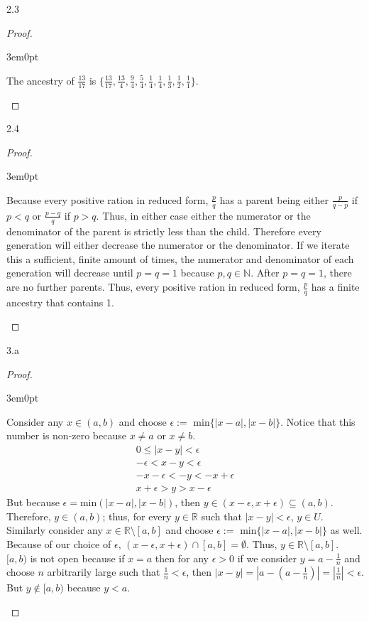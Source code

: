 \documentclass[11pt]{article}
\newcommand{\R}{\mathbb{R}}
\newcommand{\N}{\mathbb{N}}
\newenvironment{myproof}
{\begin{proof} \begin{adjustwidth}{3em}{0pt}$ $\par\nobreak\ignorespaces}
{\end{adjustwidth} \end{proof}}
\begin{document}
\begin{flushleft}
2.3
\begin{myproof}
The ancestry of $\frac{13}{17}$ is $\{ \frac{13}{17} , \frac{13}{4}, \frac{9}{4}, \frac{5}{4}, \frac{1}{4}, \frac{1}{4}, \frac{1}{3}, \frac{1}{2}, \frac{1}{1} \}$.
\end{myproof}

2.4

\begin{myproof}
Because every positive ration in reduced form, $\frac{p}{q}$ has a parent being either $\frac{p}{q-p}$ if $p<q$ or $\frac{p-q}{q}$ if $p>q$. Thus, in either case either the numerator or the denominator of the parent is strictly less than the child. Therefore every generation will either decrease the numerator or the denominator. If we iterate this a sufficient, finite amount of times, the numerator and denominator of each generation will decrease until $p = q =1$ because $p,q \in \N$. After $p = q = 1$, there are no further parents. Thus, every positive ration in reduced form, $\frac{p}{q}$ has a finite ancestry that contains 1.
\end{myproof}

\newpage

3.a

\begin{myproof}
Consider any $x \in (a,b)$ and choose $\epsilon := \text{ min}\{|x-a|,|x-b|\}$. Notice that this number is non-zero because $x \neq a$ or $x \neq b$.
\begin{align*}
0 \leq |x-y| < \epsilon \\
-\epsilon < x-y < \epsilon \\
-x-\epsilon < -y < -x +\epsilon \\
x + \epsilon > y > x - \epsilon
\end{align*} 
But because $\epsilon = \text{min}(|x-a|,|x-b|)$, then $y \in (x-\epsilon, x + \epsilon) \subseteq (a,b)$. Therefore, $y \in (a,b)$; thus, for every $y \in \R$ such that $|x-y| < \epsilon$, $y \in U$. \\
\bigskip
Similarly consider any $x \in \R \setminus [a,b]$ and choose $\epsilon := \text{ min}\{|x-a|,|x-b|\}$ as well. Because of our choice of $\epsilon$, $(x-\epsilon, x + \epsilon) \cap [a,b] = \emptyset$. Thus, $y \in \R \setminus [a,b]$. \\
\bigskip
$[a,b)$ is not open because if $x = a$ then for any $\epsilon > 0$ if we consider $y = a - \frac{1}{n}$  and choose $n$ arbitrarily large such that $\frac{1}{n} < \epsilon$, then $| x- y| = |a-(a-\frac{1}{n})| = |\frac{1}{n}| < \epsilon$. But $y \notin [a,b)$ because $y < a$.
\end{myproof}


\end{flushleft}
\end{document}
